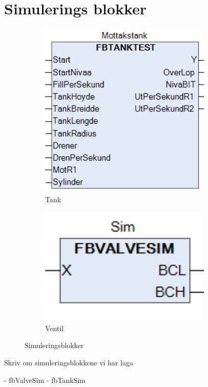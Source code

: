 \section{Simulerings blokker}
\thispagestyle{fancy}




\begin{figure}[htbp]
    \centering
    \begin{subfigure}[b]{0.3\textwidth}
        \centering
        \includegraphics[width=0.9\textwidth]{Figurar/TankSim.png}
        \caption{Tank}\label{fig:subfig1}
    \end{subfigure}
    \hfill
    \begin{subfigure}[b]{0.3\textwidth}
        \centering
        \includegraphics[width=0.9\textwidth]{Figurar/ValveSim.png}
        \caption{Ventil}\label{fig:subfig2}
    \end{subfigure}
    \caption{Simuleringsblokker}\label{fig:Illustrasjon-Diffuser}
\end{figure}


Skriv om simuleringsblokkene vi har laga

- fbValveSim
- fbTankSim